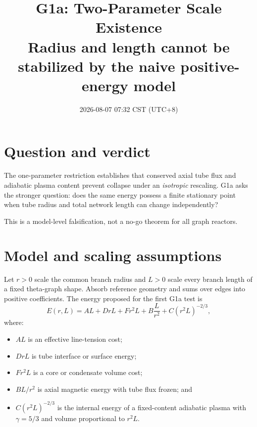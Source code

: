 \documentclass[11pt]{article}
\title{G1a: Two-Parameter Scale Existence\\
\large Radius and length cannot be stabilized by the naive positive-energy model}
\author{}
\date{2026-08-07 07:32 CST (UTC+8)}
\begin{document}
\maketitle

\section{Question and verdict}

The one-parameter restriction establishes that conserved axial tube flux and
adiabatic plasma content prevent collapse under an \emph{isotropic} rescaling. G1a
asks the stronger question: does the same energy possess a finite stationary point
when tube radius and total network length can change independently?

\begin{center}
\end{center}

This is a model-level falsification, not a no-go theorem for all graph reactors.

\section{Model and scaling assumptions}

Let $r>0$ scale the common branch radius and $L>0$ scale every branch length of a
fixed theta-graph shape. Absorb reference geometry and sums over edges into positive
coefficients. The energy proposed for the first G1a test is
\begin{equation}
E(r,L)=
AL+DrL+Fr^2L+B\frac{L}{r^2}
+C(r^2L)^{-2/3},
\label{eq:energy}
\end{equation}
where:
\begin{itemize}
\item $AL$ is an effective line-tension cost;
\item $DrL$ is tube interface or surface energy;
\item $Fr^2L$ is a core or condensate volume cost;
\item $BL/r^2$ is axial magnetic energy with tube flux frozen; and
\item $C(r^2L)^{-2/3}$ is the internal energy of a fixed-content adiabatic plasma
with $\gamma=5/3$ and volume proportional to $r^2L$.
\end{itemize}
\end{document}
